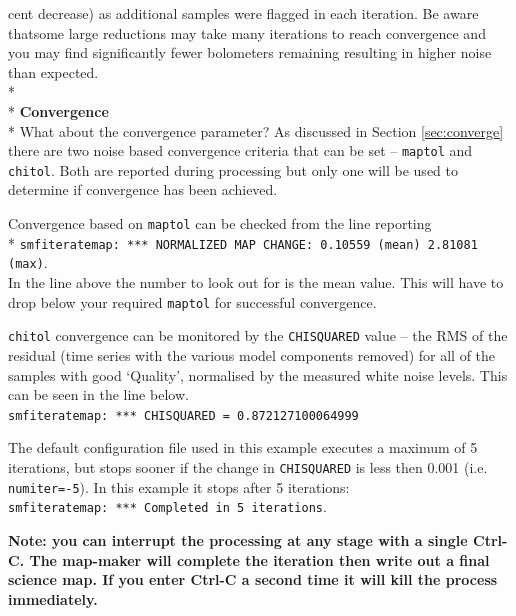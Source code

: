 \documentclass[twoside,11pt]{article}
\renewcommand{\_}{\texttt{\symbol{95}}}
\begin{document}
cent decrease) as additional samples were flagged in each iteration. Be aware thatsome large reductions may take many iterations to reach convergence and you may find significantly fewer bolometers remaining resulting in higher noise than expected.
\\*\\*
\textbf{Convergence}\\*
What about the convergence parameter? As discussed in Section \ref{sec:converge} there are two noise based convergence criteria that can be set --  \texttt{maptol} and \texttt{chitol}. Both are reported during processing but only one will be used to determine if convergence has been achieved. 

Convergence based on \texttt{maptol} can be checked from the line reporting\\*
\hspace{5mm}\texttt{smf\_iteratemap: *** NORMALIZED MAP CHANGE: 0.10559 (mean) 2.81081 (max)}.\\
In the line above the number to look out for is the mean value. This will have to drop below your required \texttt{maptol} for successful convergence.

\texttt{chitol} convergence  can be monitored by the \texttt{CHISQUARED} value -- the RMS of the residual (time series with the various model components removed) for all of the samples with good `Quality', normalised by the measured white noise levels. This can be seen in the line below.\\
\hspace{0.5cm}\texttt{smf\_iteratemap: *** CHISQUARED = 0.872127100064999}


The default configuration file used in this example executes a maximum of 5 iterations, but stops sooner if the change in \texttt{CHISQUARED} is less then 0.001 (i.e. \texttt{numiter=-5}). In this example it stops after 5 iterations: \\
\texttt{smf\_iteratemap: *** Completed in 5 iterations}.


\textbf{Note: you can interrupt the processing at any stage with a single Ctrl-C. The map-maker will complete the iteration then write out a final science map. If you enter Ctrl-C a second time it will kill the process immediately.}
\end{document}
